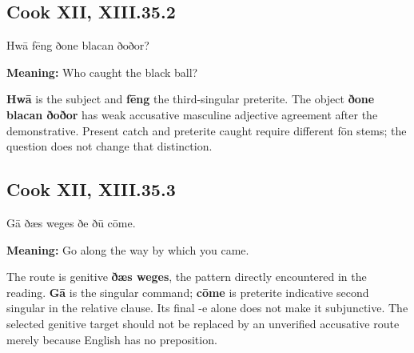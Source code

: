 \par\begin{minipage}{\linewidth}\raggedright
\subsection*{Cook XII, XIII.35.2}

Hwā fēng ðone blacan ðoðor?

\textbf{Meaning:} Who caught the black ball?

\textbf{Hwā} is the subject and \textbf{fēng} the third-singular preterite. The object \textbf{ðone blacan ðoðor} has weak accusative masculine adjective agreement after the demonstrative. Present catch and preterite caught require different fōn stems; the question does not change that distinction.

\end{minipage}\par\addvspace{4pt}

\par\begin{minipage}{\linewidth}\raggedright
\subsection*{Cook XII, XIII.35.3}

Gā ðæs weges ðe ðū cōme.

\textbf{Meaning:} Go along the way by which you came.

The route is genitive \textbf{ðæs weges}, the pattern directly encountered in the reading. \textbf{Gā} is the singular command; \textbf{cōme} is preterite indicative second singular in the relative clause. Its final -e alone does not make it subjunctive. The selected genitive target should not be replaced by an unverified accusative route merely because English has no preposition.

\end{minipage}\par\addvspace{4pt}

